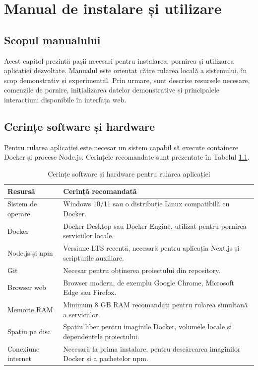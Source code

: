 \chapter{Manual de instalare și utilizare}
\pagestyle{fancy}

\section{Scopul manualului}

Acest capitol prezintă pașii necesari pentru instalarea, pornirea și utilizarea aplicației dezvoltate. Manualul este orientat către rularea locală a sistemului, în scop demonstrativ și experimental. Prin urmare, sunt descrise resursele necesare, comenzile de pornire, inițializarea datelor demonstrative și principalele interacțiuni disponibile în interfața web.

\section{Cerințe software și hardware}

Pentru rularea aplicației este necesar un sistem capabil să execute containere Docker și procese Node.js. Cerințele recomandate sunt prezentate în Tabelul \ref{tab:cerinte-instalare}.

\begin{table}[htbp]
\centering
\small
\begin{tabular}{|p{}|p{}|}
\hline
\textbf{Resursă} & \textbf{Cerință recomandată} \\
\hline
Sistem de operare & Windows 10/11 sau o distribuție Linux compatibilă cu Docker. \\
\hline
Docker & Docker Desktop sau Docker Engine, utilizat pentru pornirea serviciilor locale. \\
\hline
Node.js și npm & Versiune LTS recentă, necesară pentru aplicația Next.js și scripturile auxiliare. \\
\hline
Git & Necesar pentru obținerea proiectului din repository. \\
\hline
Browser web & Browser modern, de exemplu Google Chrome, Microsoft Edge sau Firefox. \\
\hline
Memorie RAM & Minimum 8 GB RAM recomandați pentru rularea simultană a serviciilor. \\
\hline
Spațiu pe disc & Spațiu liber pentru imaginile Docker, volumele locale și dependențele proiectului. \\
\hline
Conexiune internet & Necesară la prima instalare, pentru descărcarea imaginilor Docker și a pachetelor npm. \\
\hline
\end{tabular}
\caption{Cerințe software și hardware pentru rularea aplicației}
\label{tab:cerinte-instalare}
\end{table}

